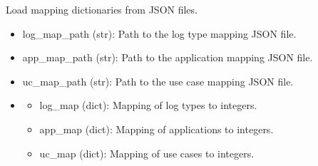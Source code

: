 \documentclass[letterpaper,10pt,english]{sphinxmanual}
\begin{document}

\begin{fulllineitems}
\label{\detokenize{eda:eda.load_maps}}
\pysigstartsignatures
{}
\pysigstopsignatures
\sphinxAtStartPar
Load mapping dictionaries from JSON files.
\begin{description}
\begin{itemize}
\item {} 
\sphinxAtStartPar
log\_map\_path (str): Path to the log type mapping JSON file.

\item {} 
\sphinxAtStartPar
app\_map\_path (str): Path to the application mapping JSON file.

\item {} 
\sphinxAtStartPar
uc\_map\_path (str): Path to the use case mapping JSON file.

\end{itemize}

\begin{itemize}
\item {} \begin{description}
\begin{itemize}
\item {} 
\sphinxAtStartPar
log\_map (dict): Mapping of log types to integers.

\item {} 
\sphinxAtStartPar
app\_map (dict): Mapping of applications to integers.

\item {} 
\sphinxAtStartPar
uc\_map (dict): Mapping of use cases to integers.

\end{itemize}

\end{description}

\end{itemize}

\end{description}

\end{fulllineitems}
\end{document}
